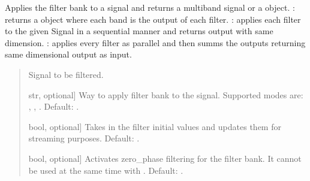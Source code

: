 \documentclass[letterpaper,10pt,english]{sphinxmanual}
\begin{document}
\begin{fulllineitems}
\begin{fulllineitems}
\label{\detokenize{classes:dsptoolbox.classes.filterbank.FilterBank.filter_signal}}
\pysigstartsignatures
{}
\pysigstopsignatures
\sphinxAtStartPar
Applies the filter bank to a signal and returns a multiband signal
or a  object.
: returns a  object where each band is
the output of each filter.
: applies each filter to the given Signal in a sequential
manner and returns output with same dimension.
: applies every filter as parallel and then summs the outputs
returning same dimensional output as input.
\begin{quote}\begin{description}
\begin{description}
\sphinxlineitem{\sphinxstylestrong{signal}}{[}\sphinxtitleref{Signal}{]}
\sphinxAtStartPar
Signal to be filtered.

\sphinxlineitem{\sphinxstylestrong{mode}}{[}str, optional{]}
\sphinxAtStartPar
Way to apply filter bank to the signal. Supported modes are:
, , . Default: .

\sphinxlineitem{\sphinxstylestrong{activate\_zi}}{[}bool, optional{]}
\sphinxAtStartPar
Takes in the filter initial values and updates them for
streaming purposes. Default: .

\sphinxlineitem{\sphinxstylestrong{zero\_phase}}{[}bool, optional{]}
\sphinxAtStartPar
Activates zero\_phase filtering for the filter bank. It cannot be
used at the same time with . Default: .


\end{description}
\end{description}
\end{quote}
\end{fulllineitems}
\end{fulllineitems}
\end{document}
